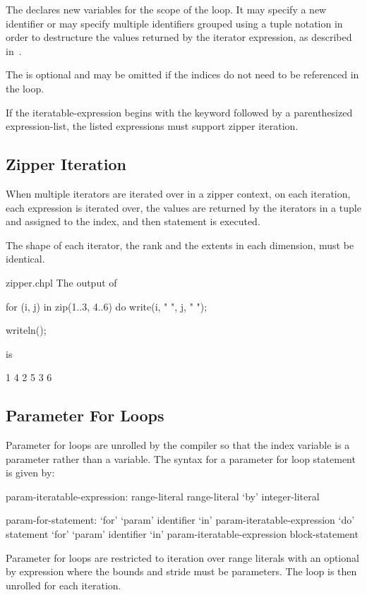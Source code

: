 The  declares new variables for the scope
of the loop.  It may specify a new identifier or may specify multiple
identifiers grouped using a tuple notation in order to destructure the
values returned by the iterator expression, as described
in~.

The  is optional and may be omitted if the
indices do not need to be referenced in the loop.

If the iteratable-expression begins with the keyword  followed
by a parenthesized expression-list, the listed expressions must support 
zipper iteration.

\subsection{Zipper Iteration}
\label{Zipper_Iteration}

When multiple iterators are iterated over in a zipper context, on each
iteration, each expression is iterated over, the values are returned
by the iterators in a tuple and assigned to the index, and then
statement is executed.

The shape of each iterator, the rank and the extents in each
dimension, must be identical.

\begin{chapelexample}{zipper.chpl}
The output of
\begin{chapel}
for (i, j) in zip(1..3, 4..6) do
  write(i, " ", j, " ");
\end{chapel}
\begin{chapelpost}
writeln();
\end{chapelpost}
is
\begin{chapelprintoutput}{}
1 4 2 5 3 6 
\end{chapelprintoutput}
\end{chapelexample}

\subsection{Parameter For Loops}
\label{Parameter_For_Loops}

Parameter for loops are unrolled by the compiler so that the index
variable is a parameter rather than a variable.  The syntax for a
parameter for loop statement is given by:
\begin{syntax}
param-iteratable-expression:
  range-literal
  range-literal `by' integer-literal

param-for-statement:
  `for' `param' identifier `in' param-iteratable-expression `do' statement
  `for' `param' identifier `in' param-iteratable-expression block-statement
\end{syntax}
Parameter for loops are restricted to iteration over range literals
with an optional by expression where the bounds and stride must be
parameters.  The loop is then unrolled for each iteration.

